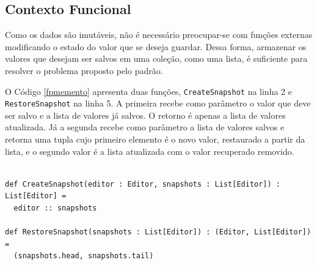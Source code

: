 \subsection*{Contexto Funcional}

Como os dados são imutáveis, não é necessário 
preocupar-se com funções externas modificando o 
estado do valor que se deseja guardar. Dessa forma, 
armazenar os valores que desejam ser salvos em 
uma coleção, como uma lista, é suficiente para 
resolver o problema proposto pelo padrão.

O Código \ref{fpmemento} apresenta duas funções, 
\texttt{CreateSnapshot} na linha 2 e \texttt{RestoreSnapshot} na linha 
5. A primeira recebe como parâmetro o valor que 
deve ser salvo e a lista de valores já salvos. 
O retorno é apenas a lista de valores atualizada. 
Já a segunda recebe como parâmetro a lista de 
valores salvos e retorna uma tupla cujo 
primeiro elemento é o novo valor, restaurado 
a partir da lista, e o segundo valor é a 
lista atualizada com o valor recuperado 
removido.

\begin{lstlisting}[caption={\textit{Memento} Funcional.},label=fpmemento]

def CreateSnapshot(editor : Editor, snapshots : List[Editor]) : List[Editor] =
  editor :: snapshots

def RestoreSnapshot(snapshots : List[Editor]) : (Editor, List[Editor]) =
  (snapshots.head, snapshots.tail)

\end{lstlisting}
